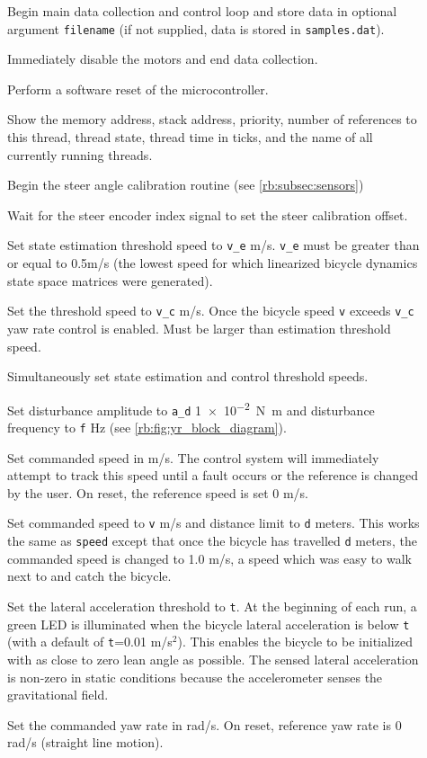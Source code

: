 \begin{description}
  \item[] Begin main data collection and control loop and store
    data in optional argument \verb|filename| (if not supplied, data is stored in
    \verb|samples.dat|).
  \item[] Immediately disable the motors and end data collection.
  \item[] Perform a software reset of the microcontroller.
  \item[] Show the memory address, stack address, priority, number
    of references to this thread, thread state, thread time in ticks, and the
    name of all currently running threads.
  \item[] Begin the steer angle calibration routine (see
    \autoref{rb:subsec:sensors})
  \item[] Wait for the steer encoder index signal to set the steer calibration offset.
  \item[] Set state estimation threshold speed to \verb|v_e| m/s.
    \verb|v_e| must be greater than or equal to 0.5m/s (the lowest speed
    for which linearized bicycle dynamics state space matrices were generated).
  \item[] Set the threshold speed to \verb|v_c| m/s. Once the
    bicycle speed \verb|v| exceeds \verb|v_c| yaw rate control is enabled. Must
    be larger than estimation threshold speed.
  \item[] Simultaneously set state estimation and control threshold speeds.
  \item[] Set disturbance amplitude to
    \verb|a_d| \SI{1e-2}{\N\m}
    and disturbance frequency to \verb|f| \si{\Hz} (see
    \autoref{rb:fig:yr_block_diagram}).
  \item[] Set commanded speed in m/s. The control system will
    immediately attempt to track this speed until a fault occurs or the
    reference is changed by the user. On reset, the reference speed is set 0
    m/s.
  \item[] Set commanded speed to \verb|v| m/s and distance
    limit to \verb|d| meters. This works the same as \verb|speed| except that
    once the bicycle has travelled \verb|d| meters, the commanded speed is
    changed to 1.0 m/s, a speed which was easy to walk next to and catch the
    bicycle.
  \item[] Set the lateral acceleration threshold to \verb|t|. At
    the beginning of each run, a green LED is illuminated when the bicycle
    lateral acceleration is below \verb|t| (with a default of \verb|t|=0.01
    m/s$^2$). This enables the bicycle to be initialized with as close to zero
    lean angle as possible. The sensed lateral acceleration is non-zero in
    static conditions because the accelerometer senses the gravitational field.
  \item[] Set the commanded yaw rate in rad/s. On
    reset, reference yaw rate is 0 rad/s (straight line motion).

\end{description}

